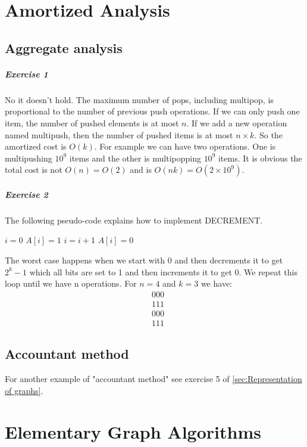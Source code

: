 \documentclass{book}
\begin{document}
	\chapter{Amortized Analysis}
	\section{Aggregate analysis}
	\paragraph{Exercise 1}
	No it doesn't hold. The maximum number of pops, including multipop, is proportional to the number of previous push operations. If we can only push one item, the number of pushed elements is at most $n$. If we add a new operation named multipush, then the number of pushed items is at most $n \times k$. So the amortized cost is $O(k)$. For example we can have two operations. One is multipushing $10^9$ items and the other is multipopping $10^9$ items. It is obvious the total cost is not $O(n) = O(2)$ and is $O(nk) = O(2 \times 10^9)$.
	\paragraph{Exercise 2}
	The following pseudo-code explains how to implement DECREMENT.
	\begin{algorithm*}[h!]
		\begin{algorithmic}[1]
			\State $i = 0$
			\State $A[i] = 1$
			\State $i = i + 1$
			\EndWhile
			\State $A[i] = 0$
			\EndIf
			\EndFunction
		\end{algorithmic}
	\end{algorithm*}
	The worst case happens when we start with 0 and then decrements it to get $2^k - 1$ which all bits are set to 1 and then increments it to get 0. We repeat this loop until we have n operations. For $n = 4$ and $k = 3$ we have:
	\begin{align*}
		&000 \\
		&111 \\
		&000 \\
		&111
	\end{align*}
	\section{Accountant method}
	For another example of "accountant method" see exercise 5 of \ref{sec:Representation of graphs}.
	\chapter{Elementary Graph Algorithms}
\end{document}
